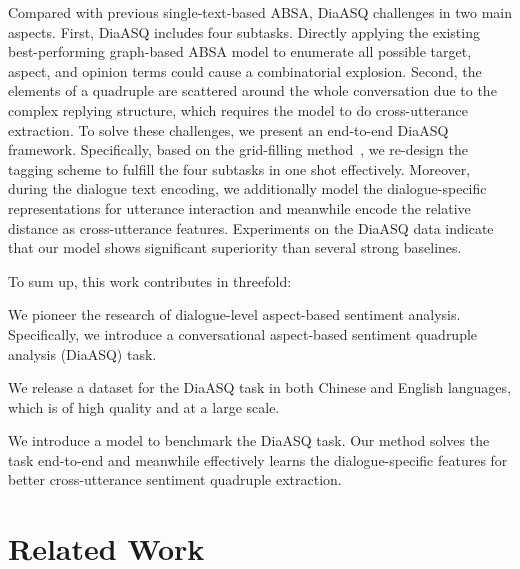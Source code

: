 \documentclass[11pt]{article}
\begin{document}
Compared with previous single-text-based ABSA, DiaASQ challenges in two main aspects.
First, DiaASQ includes four subtasks.
Directly applying the existing best-performing graph-based ABSA model to enumerate all possible target, aspect, and opinion terms could cause a combinatorial explosion.
Second, the elements of a quadruple are scattered around the whole conversation due to the complex replying structure, which 
requires the model to do cross-utterance extraction.
To solve these challenges, we present an end-to-end DiaASQ framework.
Specifically, based on the grid-filling method~\cite{wu-etal-2020-grid}, we re-design the tagging scheme to fulfill the four subtasks in one shot effectively.
Moreover, during the dialogue text encoding, we additionally model the dialogue-specific representations for utterance interaction and meanwhile encode the relative distance as cross-utterance features. 
Experiments on the DiaASQ data indicate that our model shows significant superiority than several strong baselines.

To sum up, this work contributes in threefold:
\begin{compactitem}
  \item We pioneer the research of dialogue-level aspect-based sentiment analysis.
  Specifically, we introduce a conversational aspect-based sentiment quadruple analysis (DiaASQ) task. 
  \item We release a dataset for the DiaASQ task in both Chinese and English languages, which is of high quality and at a large scale.
  \item We introduce a model to benchmark the DiaASQ task.
  Our method solves the task end-to-end and meanwhile effectively learns the dialogue-specific features for better cross-utterance sentiment quadruple extraction.
  
\end{compactitem}

\vspace{-1mm}
\section{Related Work}
\end{document}
